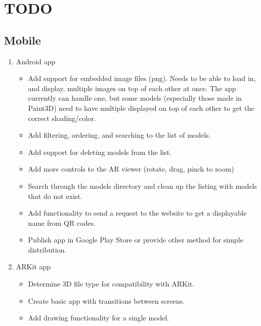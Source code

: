 
\chapter{TODO}
\label{ch:TODO}
    \section{Mobile}
        \begin{enumerate}
            \item Android app
            \begin{itemize}
                \item Add support for embedded image files (png).  Needs to be able to load in, and display, multiple images on top of each other at once.  The app currently can handle one, but some models (especially those made in Paint3D) need to have multiple displayed on top of each other to get the correct shading/color.

                \item Add filtering, ordering, and searching to the list of models.

                \item Add support for deleting models from the list.

                \item Add more controls to the AR viewer (rotate, drag, pinch to zoom)

                \item Search through the models directory and clean up the listing with models that do not exist.

                \item Add functionality to send a request to the website to get a displayable name from QR codes.

                \item Publish app in Google Play Store or provide other method for simple distribution.

            \end{itemize}
            \item ARKit app
            \begin{itemize}
                \item Determine 3D file type for compatibility with ARKit.

                \item Create basic app with transitions between screens.

                \item Add drawing functionality for a single model.


\end{itemize}
\end{enumerate}
